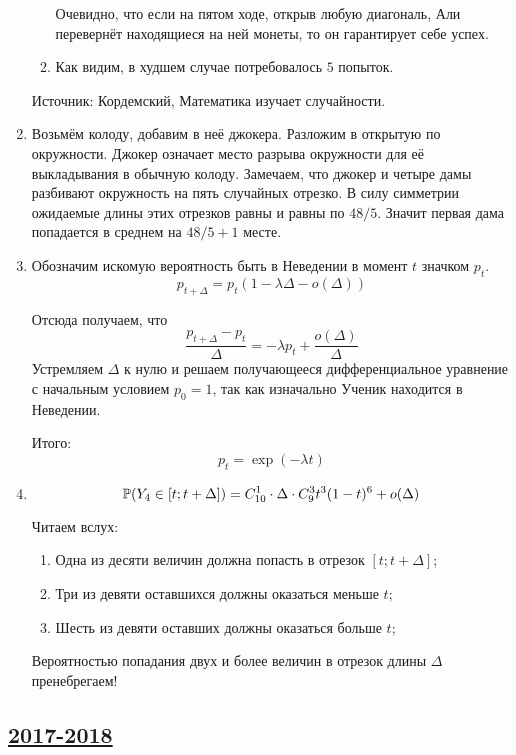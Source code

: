 \begin{enumerate}
\begin{enumerate}
Очевидно, что если на пятом ходе, открыв любую диагональ, Али перевернёт находящиеся
на ней монеты, то он гарантирует себе успех.

\item Как видим, в худшем случае потребовалось $5$ попыток.
\end{enumerate}
Источник: Кордемский, Математика изучает случайности.

\item Возьмём колоду, добавим в неё джокера. Разложим в открытую по окружности.
Джокер означает место разрыва окружности для её выкладывания в обычную колоду.
Замечаем, что джокер и четыре дамы разбивают окружность на пять случайных отрезко.
В силу симметрии ожидаемые длины этих отрезков равны и равны по $48/5$.
Значит первая дама попадается в среднем на $48/5 + 1$ месте.

\item Обозначим искомую вероятность быть в Неведении в момент $t$ значком $p_t$.
\[
p_{t+\Delta} = p_t (1-\lambda\Delta - o(\Delta))
\]

Отсюда получаем, что
\[
\frac{p_{t+\Delta} - p_t}{\Delta} = -\lambda p_t + \frac{o(\Delta)}{\Delta}
\]
Устремляем $\Delta$ к нулю и решаем получающееся дифференциальное уравнение
с начальным условием $p_0 = 1$, так как изначально Ученик находится в Неведении.

Итого:
\[
p_t = \exp(-\lambda t)
\]

\item
\[
\P(Y_4 \in [t; t+\Delta]) = C_{10}^1 \cdot \Delta \cdot C_{9}^3 t^3 (1-t)^6 + o(\Delta)
\]

Читаем вслух:
\begin{enumerate}
  \item Одна из десяти величин должна попасть в отрезок $[t; t + \Delta]$;
  \item Три из девяти оставшихся должны оказаться меньше $t$;
  \item Шесть из девяти оставших должны оказаться больше $t$;
\end{enumerate}
Вероятностью попадания двух и более величин в отрезок длины $\Delta$ пренебрегаем!
\end{enumerate}

\subsection[2017-2018]{\hyperref[sec:kr_01_ip_2017_2018]{2017-2018}}
\label{sec:sol_kr_01_ip_2017_2018}

